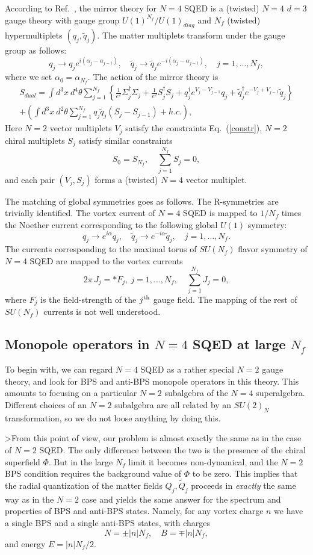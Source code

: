 \documentclass[a4paper,12pt, amsfonts, amssymb]{article}
\newcommand{\ra}{\rightarrow}
\newcommand{\tQ}{{\tilde Q}}
\newcommand{\tq}{{\tilde q}}
\begin{document}
According to Ref.~\cite{IS}, the mirror theory for $N=4$ SQED is a (twisted)
$N=4$ $d=3$ gauge theory with gauge group $U(1)^{N_f}/U(1)_{diag}$ and $N_f$ (twisted) hypermultiplets $(q_j,\tq_j)$. The matter multiplets
transform under the gauge group as follows:
$$
q_j\ra q_j e^{i(\alpha_j-\alpha_{j-1})}, \quad 
\tq_j\ra \tq_j e^{-i(\alpha_j-\alpha_{j-1})},\quad j=1,\ldots,N_f,
$$
where we set $\alpha_0=\alpha_{N_f}$. 
The action of the mirror theory is
\begin{multline*}
S_{dual}=\int d^3x\ d^4\theta \sum_{j=1}^{N_f}\left\{
\frac{1}{e^2}\Sigma_j^\dag\Sigma_j + \frac{1}{e^2} S_j^\dag S_j+
q_j^\dag e^{V_{j}-V_{j-1}} q_j+
\tq_j^\dag e^{-V_{j}+V_{j-1}} \tq_j\right\}\\
+\left(\int d^3x\ d^2\theta \sum_{j=1}^{N_f} q_j \tq_j (S_j-S_{j-1})
+h.c.\right), 
\end{multline*}
Here $N=2$ vector multiplets $V_j$ satisfy the constraints Eq.~(\ref{constr}), 
$N=2$ chiral multiplets $S_j$ satisfy similar constraints
$$
S_0=S_{N_f},\quad \sum_{j=1}^{N_f} S_j=0,
$$
and each pair $(V_j,S_j)$ forms a (twisted) $N=4$ vector multiplet.

The matching of global symmetries goes as follows. The R-symmetries are
trivially identified. The vortex current of $N=4$ SQED is mapped to $1/N_f$
times the Noether current corresponding to the following global $U(1)$
symmetry:
$$
q_j\ra e^{i\alpha} q_j,\quad \tq_j\ra e^{-i\alpha}\tq_j,\quad j=1,\ldots,N_f.
$$
The currents corresponding to the maximal torus of $SU(N_f)$ flavor symmetry
of $N=4$ SQED are mapped to the vortex currents
$$
2\pi\, J_j=*F_j,\ j=1,\ldots,N_f,\quad \sum_{j=1}^{N_f} J_j=0,
$$
where $F_j$ is the field-strength of the $j^{\rm th}$ gauge field.
The mapping of the rest of $SU(N_f)$ currents is not well understood.


\subsection{Monopole operators in $N=4$ SQED at large $N_f$}

To begin with, we can regard $N=4$ SQED as a rather special $N=2$ gauge
theory, and look for BPS and anti-BPS monopole operators in this theory.
This amounts to focusing on a particular $N=2$ subalgebra of the
$N=4$ superalgebra. Different choices of an $N=2$ subalgebra are all related
by an $SU(2)_N$ transformation, so we do not loose anything by doing this.

>From this point of view, our problem is almost exactly the same as in the
case of $N=2$ SQED. The only difference between the two is the presence
of the chiral superfield $\Phi$. But in the large $N_f$ limit it becomes
non-dynamical, and the $N=2$  BPS condition requires the background value of
$\Phi$ to be zero. This implies that the radial quantization of the matter
fields $Q_j,\tQ_j$ proceeds in {\it exactly} the same way as in the
$N=2$ case and yields the same answer for the spectrum and properties
of BPS and anti-BPS states. Namely, for any vortex charge $n$ we have a 
single BPS and a single anti-BPS states, with charges
$$
N=\pm |n| N_f,\quad B=\mp |n|N_f,
$$
and energy $E=|n|N_f/2.$
\end{document}
